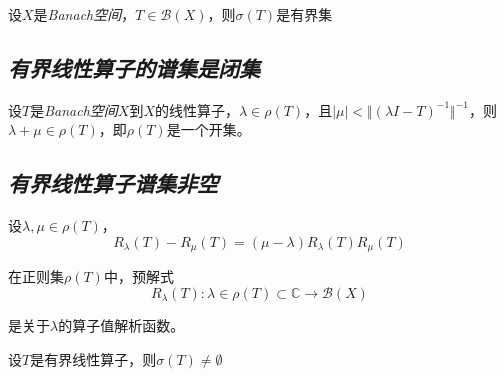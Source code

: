 \begin{mdframed}
    \begin{theorem}
        设$X$是\textsl{Banach空间}，$T\in \mathcal{B}(X)$，则$\sigma(T)$是有界集
    \end{theorem}
\end{mdframed}

\subsection*{\textsl{有界线性算子的谱集是闭集}}

\begin{mdframed}
    \begin{theorem}
        设$T$是\textsl{Banach空间}$X$到$X$的线性算子，$\lambda\in \rho(T)$，且$|\mu|<\Vert (\lambda I-T)^{-1}\Vert^{-1}$，则$\lambda+\mu\in \rho(T)$，即$\rho(T)$是一个开集。
    \end{theorem}
\end{mdframed}

\subsection*{\textsl{有界线性算子谱集非空}}

\begin{mdframed}
    \begin{lemma}
        设$\lambda,\mu\in \rho(T)$，
        \begin{equation}
            R_\lambda(T)-R_\mu(T)=(\mu-\lambda)R_{\lambda}(T)R_\mu(T)
        \end{equation}
    \end{lemma}
\end{mdframed}

\begin{mdframed}
    \begin{theorem}
        在正则集$\rho(T)$中，预解式
        \begin{equation}
            R_\lambda(T):\lambda\in \rho(T)\subset \mathbb{C}\rightarrow \mathcal{B}(X)
        \end{equation}

        是关于$\lambda$的算子值解析函数。
    \end{theorem}
\end{mdframed}

\begin{mdframed}
    \begin{theorem}
        设$T$是有界线性算子，则$\sigma(T)\neq \emptyset$
    \end{theorem}
\end{mdframed}

